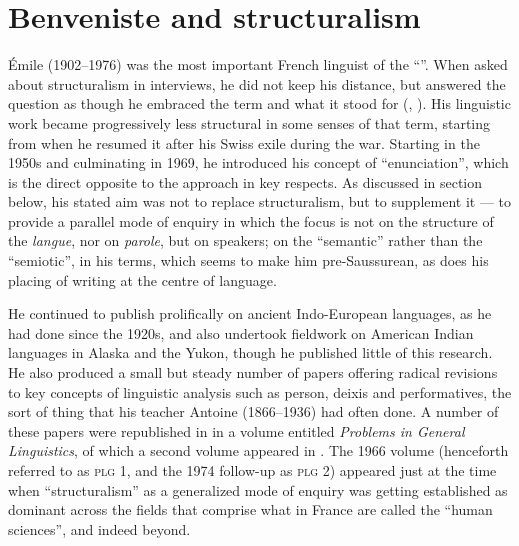 \documentclass[output=paper]{langscibook}
\begin{document}
\section{Benveniste and structuralism}
\label{sec:joseph:bevenistestructuralism}

Émile {\Benveniste} (1902--1976) was the most important French linguist of the ``''. When asked about structuralism in interviews, he did not keep his distance, but answered the question as though he embraced the term and what it stood for (\citealt{Benveniste1968langage}, \citealt{Benveniste1968structuralisme}). His linguistic work became progressively less structural in some senses of that term, starting from when he resumed it after his Swiss exile during the war. Starting in the 1950s and culminating in 1969, he introduced his concept of ``enunciation'', which is the direct opposite to the  approach in key respects. As discussed in section  below, his stated aim was not to replace structuralism, but to supplement it — to provide a parallel mode of enquiry in which the focus is not on the structure of the \emph{langue}, nor on \emph{parole}, but on speakers; on the ``semantic'' rather than the ``semiotic'', in his terms, which seems to make him pre-Saussurean, as does his placing of writing at the centre of language.

He continued to publish prolifically on ancient Indo-European languages, as he had done since the 1920s, and also undertook fieldwork on American Indian languages in Alaska and the Yukon, though he published little of this research. He also produced a small but steady number of papers offering radical revisions to key concepts of linguistic analysis such as person, deixis and performatives, the sort of thing that his teacher Antoine {\Meillet} (1866--1936) had often done. A number of these papers were republished in \citeyear{Benveniste1966} in a volume entitled \emph{Problems in General Linguistics}, of which a second volume appeared in \citeyear{Benveniste1974}. The 1966 volume (henceforth referred to as \textsc{plg 1}, and the 1974 follow-up as \textsc{plg 2}) appeared just at the time when ``structuralism'' as a generalized mode of enquiry was getting established as dominant across the fields that comprise what in France are called the ``human sciences'', and indeed beyond.
\end{document}
